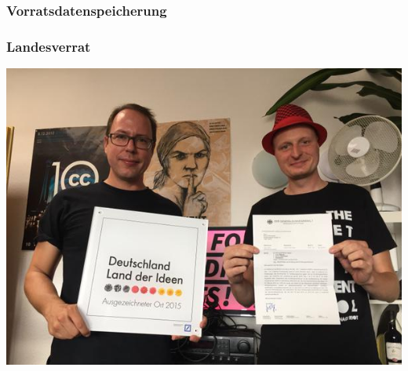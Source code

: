 \documentclass[12pt, xcolor={svgnames,table}]{beamer}
\begin{document}
\begin{frame}
  \frametitle{Vorratsdatenspeicherung}
    \begin{center}
    \end{center}
\end{frame}

\begin{frame}
  \frametitle{Landesverrat}
  \begin{center}
    \includegraphics[height=0.7\textheight]{img/landesverrat.jpg}
  \end{center}
\end{frame}
\end{document}
